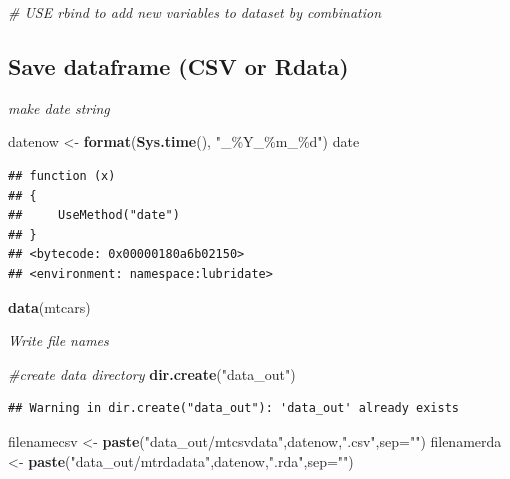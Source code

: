 \documentclass[
]{article}
\newenvironment{Shaded}{\begin{snugshade}}{\end{snugshade}}
\newcommand{\AttributeTok}[1]{\textcolor[rgb]{0.13,0.29,0.53}{#1}}
\newcommand{\CommentTok}[1]{\textcolor[rgb]{0.56,0.35,0.01}{\textit{#1}}}
\newcommand{\FunctionTok}[1]{\textcolor[rgb]{0.13,0.29,0.53}{\textbf{#1}}}
\newcommand{\NormalTok}[1]{#1}
\newcommand{\OtherTok}[1]{\textcolor[rgb]{0.56,0.35,0.01}{#1}}
\newcommand{\StringTok}[1]{\textcolor[rgb]{0.31,0.60,0.02}{#1}}
\begin{document}
\begin{Shaded}
\begin{Highlighting}[]
\CommentTok{\# USE rbind to add new variables to dataset by combination}
\end{Highlighting}
\end{Shaded}

\hypertarget{save-dataframe-csv-or-rdata}{%
\subsection{Save dataframe (CSV or Rdata)}\label{save-dataframe-csv-or-rdata}}

\emph{make date string}

\begin{Shaded}
\begin{Highlighting}[]
\NormalTok{datenow }\OtherTok{\textless{}{-}} \FunctionTok{format}\NormalTok{(}\FunctionTok{Sys.time}\NormalTok{(), }\StringTok{"\_\%Y\_\%m\_\%d"}\NormalTok{)}
\NormalTok{date}
\end{Highlighting}
\end{Shaded}

\begin{verbatim}
## function (x) 
## {
##     UseMethod("date")
## }
## <bytecode: 0x00000180a6b02150>
## <environment: namespace:lubridate>
\end{verbatim}

\begin{Shaded}
\begin{Highlighting}[]
\FunctionTok{data}\NormalTok{(mtcars)}
\end{Highlighting}
\end{Shaded}

\emph{Write file names}

\begin{Shaded}
\begin{Highlighting}[]
\CommentTok{\#create data directory}
\FunctionTok{dir.create}\NormalTok{(}\StringTok{"data\_out"}\NormalTok{)}
\end{Highlighting}
\end{Shaded}

\begin{verbatim}
## Warning in dir.create("data_out"): 'data_out' already exists
\end{verbatim}

\begin{Shaded}
\begin{Highlighting}[]
\NormalTok{filenamecsv }\OtherTok{\textless{}{-}} \FunctionTok{paste}\NormalTok{(}\StringTok{"data\_out/mtcsvdata"}\NormalTok{,datenow,}\StringTok{".csv"}\NormalTok{,}\AttributeTok{sep=}\StringTok{""}\NormalTok{)}
\NormalTok{filenamerda }\OtherTok{\textless{}{-}} \FunctionTok{paste}\NormalTok{(}\StringTok{"data\_out/mtrdadata"}\NormalTok{,datenow,}\StringTok{".rda"}\NormalTok{,}\AttributeTok{sep=}\StringTok{""}\NormalTok{)}
\end{Highlighting}
\end{Shaded}
\end{document}
